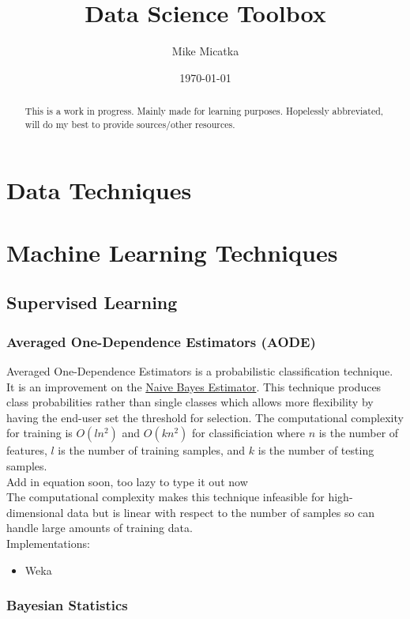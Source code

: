 \documentclass{report}
\title{Data Science Toolbox}
\author{
	Mike Micatka
}
\date{\today}
\begin{document}
\maketitle

\tableofcontents

\renewcommand{\abstractname}{What is Data Science?}
\begin{abstract}
This is a work in progress. Mainly made for learning purposes. Hopelessly 
abbreviated, will do my best to provide sources/other resources.
\end{abstract}

\chapter{Data Techniques}

\chapter{Machine Learning Techniques}
\section{Supervised Learning}
	\subsection{Averaged One-Dependence Estimators (AODE)}
Averaged One-Dependence Estimators is a probabilistic classification technique. It is an improvement on the \hyperref[subsec:bayesian_statistics]{Naive Bayes Estimator}. This technique produces class probabilities rather than single classes which allows more flexibility by having the end-user set the threshold for selection. The computational complexity for training is $O(ln^2)$ and $O(kn^2)$ for classificiation where $n$ is the number of features, $l$ is the number of training samples, and $k$ is the number of testing samples. \\
Add in equation soon, too lazy to type it out now \\
The computational complexity makes this technique infeasible for high-dimensional data but is linear with respect to the number of samples so can handle large amounts of training data. 
\\
Implementations:
\begin{itemize}
\item Weka
\end{itemize}

	\subsection{Bayesian Statistics}
	\label{subsec:bayesian_statistics}
\end{document}
